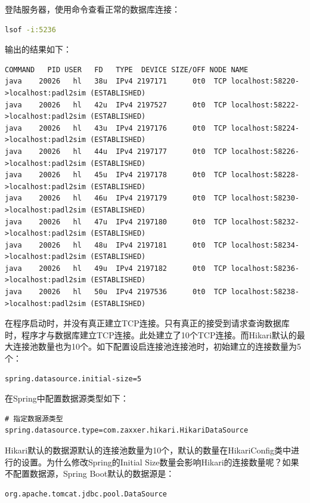 \documentclass[letter]{book}
\begin{document}
登陆服务器，使用命令查看正常的数据库连接：

\begin{lstlisting}[language=Bash]
lsof -i:5236
\end{lstlisting}

输出的结果如下：

\begin{lstlisting}
COMMAND   PID USER   FD   TYPE  DEVICE SIZE/OFF NODE NAME
java    20026   hl   38u  IPv4 2197171      0t0  TCP localhost:58220->localhost:padl2sim (ESTABLISHED)
java    20026   hl   42u  IPv4 2197527      0t0  TCP localhost:58222->localhost:padl2sim (ESTABLISHED)
java    20026   hl   43u  IPv4 2197176      0t0  TCP localhost:58224->localhost:padl2sim (ESTABLISHED)
java    20026   hl   44u  IPv4 2197177      0t0  TCP localhost:58226->localhost:padl2sim (ESTABLISHED)
java    20026   hl   45u  IPv4 2197178      0t0  TCP localhost:58228->localhost:padl2sim (ESTABLISHED)
java    20026   hl   46u  IPv4 2197179      0t0  TCP localhost:58230->localhost:padl2sim (ESTABLISHED)
java    20026   hl   47u  IPv4 2197180      0t0  TCP localhost:58232->localhost:padl2sim (ESTABLISHED)
java    20026   hl   48u  IPv4 2197181      0t0  TCP localhost:58234->localhost:padl2sim (ESTABLISHED)
java    20026   hl   49u  IPv4 2197182      0t0  TCP localhost:58236->localhost:padl2sim (ESTABLISHED)
java    20026   hl   50u  IPv4 2197536      0t0  TCP localhost:58238->localhost:padl2sim (ESTABLISHED)
\end{lstlisting}

在程序启动时，并没有真正建立TCP连接。只有真正的接受到请求查询数据库时，程序才与数据库建立TCP连接。此处建立了10个TCP连接。而Hikari默认的最大连接池数量也为10个。如下配置设启连接池连接池时，初始建立的连接数量为5个：

\begin{lstlisting}
spring.datasource.initial-size=5
\end{lstlisting}

在Spring中配置数据源类型如下：

\begin{lstlisting}
# 指定数据源类型
spring.datasource.type=com.zaxxer.hikari.HikariDataSource
\end{lstlisting}

Hikari默认的数据源默认的连接池数量为10个，默认的数量在HikariConfig类中进行的设置。为什么修改Spring的Initial Size数量会影响Hikari的连接数量呢？如果不配置数据源，Spring Boot默认的数据源是：

\begin{lstlisting}
org.apache.tomcat.jdbc.pool.DataSource
\end{lstlisting}
\end{document}
